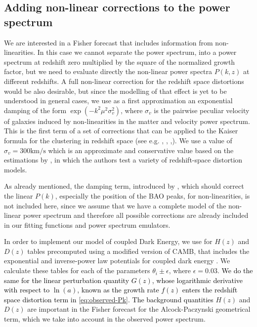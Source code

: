 \subsection{Adding non-linear corrections to the power spectrum\label{sub:Adding-non-linear-corrections}}

We are interested in a Fisher forecast that includes information from
non-linearities. In this case we cannot separate the power spectrum,
into a power spectrum at redshift zero multiplied by the square of
the normalized growth factor, but we need to evaluate directly the
non-linear power spectra $P(k,z)$ at different redshifts. A full
non-linear correction for the redshift space distortions would be
also desirable, but since the modelling of that effect is yet to be
understood in general cases, we use as a first approximation an exponential
damping of the form $\exp(-k^{2}\mu^{2}\sigma_{v}^{2})$, where $\sigma_{v}$
is the pairwise peculiar velocity of galaxies induced by non-linearities
in the matter and velocity power spectrum. This is the first term
of a set of corrections that can be applied to the Kaiser formula
\citep{kaiser_clustering_1987} for the clustering in redshift space
(see e.g. \cite{de_la_torre_modelling_2012}, \cite{scoccimarro_redshift-space_2004},
\cite{taruya_baryon_2010},\cite{wang_toward_2012}). We use a value
of $\sigma_{v}=300\mbox{km}/\mbox{s}$ which is an approximate and
conservative value based on the estimations by \citep{de_la_torre_modelling_2012},
in which the authors test a variety of redshift-space distortion models.

As already mentioned, the damping term, introduced by \citep{seo2007improved},
which should correct the linear $P(k)$, especially the position of
the BAO peaks, for non-linearities, is not included here, since we
assume that we have a complete model of the non-linear power spectrum
and therefore all possible corrections are already included in our
fitting functions and power spectrum emulators.

In order to implement our model of coupled Dark Energy, we use for
$H(z)$ and $D(z)$ tables precomputed using a modified version of
CAMB, that includes the exponential and inverse-power law potentials
for coupled dark energy \cite{amendola_testing_2012,pettorino_testing_2013}.
We calculate these tables for each of the parameters $\theta_{i}\pm\epsilon$,
where $\epsilon=0.03.$ \textcolor{black}{We do the same for the linear
perturbation quantity $G(z)$, whose logarithmic derivative with respect
to $\ln(a)$, known as the growth rate $f(z)$ enters the redshift
space distortion term in \ref{eq:observed-Pk}. The background quantities
}$H(z)$ and $D(z)$ are important in the Fisher forecast for the
Alcock-Paczynski geometrical term, which we take into account in the
observed power spectrum.

